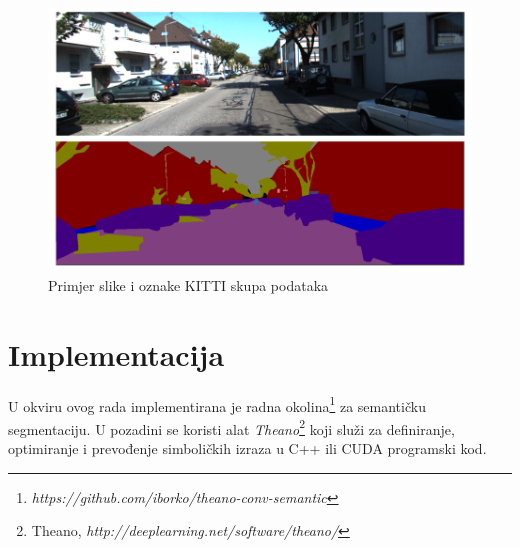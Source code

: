 \documentclass[times, utf8, diplomski, numeric]{fer}
\begin{document}
\begin{bchart}[step=5,max=40,unit=\%]
      \smallskip
      \smallskip
      \smallskip
      \smallskip
      \smallskip
      \smallskip
      \smallskip
      \smallskip
      \smallskip
      \smallskip
      \smallskip
\end{bchart}

\begin{figure}[htb]
\centering
\includegraphics[width=\textwidth]{imgs/kitti-example.png}
\caption{Primjer slike i oznake KITTI skupa podataka}
\label{fig:kitti_example}
\end{figure}

\chapter{Implementacija}

U okviru ovog rada implementirana je radna okolina\footnote{\emph{https://github.com/iborko/theano-conv-semantic}}  za semantičku segmentaciju. U pozadini se koristi alat \textit{Theano}\footnote{Theano, \emph{http://deeplearning.net/software/theano/}} \cite{Theano-2012} \cite{Theano-2010} koji služi za definiranje, optimiranje i prevođenje simboličkih izraza u C++ ili CUDA programski kod.
\end{document}
